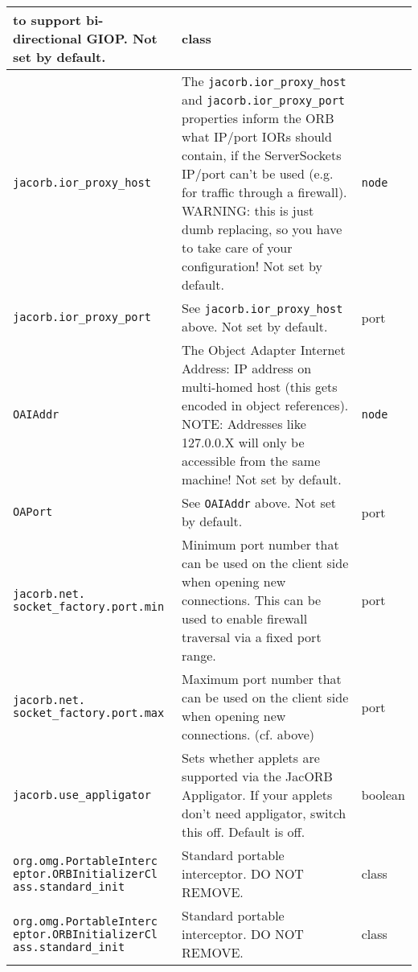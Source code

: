 \documentclass[12pt]{scrbook}
\begin{document}
\begin{small}
\begin{longtable}{|p{5cm}|p{9cm}|p{2cm}|}
to support bi-directional GIOP. Not set by default. & class \\
\hline
\verb"jacorb.ior_proxy_host" & The {\tt jacorb.ior\_proxy\_host} and
{\tt jacorb.ior\_proxy\_port} properties inform the ORB what IP/port
IORs should contain, if the ServerSockets IP/port can't be used
(e.g. for traffic through a firewall). WARNING: this is just dumb
replacing, so you have to take care of your configuration! Not set by default. & \verb"node" \\
\hline
\verb"jacorb.ior_proxy_port" & See {\tt jacorb.ior\_proxy\_host} above. Not set by default. & port \\
\hline
\verb"OAIAddr" & The Object Adapter Internet Address: IP address on
multi-homed host (this gets encoded in object references).  NOTE:
Addresses like 127.0.0.X will only be accessible from the same machine! Not set by default. & \verb"node" \\
\hline
\verb"OAPort" & See {\tt OAIAddr} above. Not set by default. & port \\
\hline
\verb"jacorb.net."
\verb"socket_factory.port.min" & Minimum port number that
can be used on the client side when opening new connections. This can
be used to enable firewall traversal via a fixed port range. & port \\
\hline
\verb"jacorb.net."
\verb"socket_factory.port.max" & Maximum port number that
can be used on the client side when opening new connections. (cf. above) & port \\
\hline
\verb"jacorb.use_appligator" & Sets whether applets are supported via
the JacORB Appligator. If your applets don't need appligator, switch
this off. Default is off. & boolean \\
\hline
\verb"org.omg.PortableInterc"
\verb"eptor.ORBInitializerCl"
\verb"ass.standard_init" & Standard portable interceptor. DO NOT REMOVE. & class \\
\hline
\verb"org.omg.PortableInterc"
\verb"eptor.ORBInitializerCl"
\verb"ass.standard_init" & Standard portable interceptor. DO NOT REMOVE. & class \\
\hline

\end{longtable}
\end{small}
\end{document}
